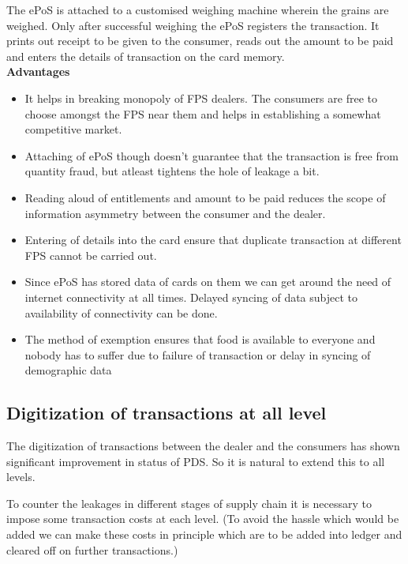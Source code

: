 \documentclass[a4paper,12pt,openany]{book}
\begin{document}
The ePoS is attached to a customised weighing machine wherein the grains are weighed. Only after successful weighing the ePoS registers the transaction. It prints out receipt to be given to the consumer, reads out the amount to be paid and enters the details of transaction on the card memory. \\

\textbf{Advantages}
\begin{itemize}
\item It helps in breaking monopoly of FPS dealers. The consumers are free to choose amongst the FPS near them and helps in establishing a somewhat competitive market.

\item Attaching of ePoS though doesn't guarantee that the transaction is free from quantity fraud, but atleast tightens the hole of leakage a bit.

\item Reading aloud of entitlements and amount to be paid reduces the scope of information asymmetry between the consumer and the dealer.

\item Entering of details into the card ensure that duplicate transaction at different FPS cannot be carried out.

\item Since ePoS has stored data of cards on them we can get around the need of internet connectivity at all times. Delayed syncing of data subject to availability of connectivity can be done.

\item The method of exemption ensures that food is available to everyone and nobody has to suffer due to failure of transaction or delay in syncing of demographic data\\

\end{itemize}


\subsection{Digitization of transactions at all level}
The digitization of transactions between the dealer and the consumers has shown significant improvement in status of PDS. So it is natural to extend this to all levels.

To counter the leakages in different stages of supply chain it is necessary to impose some transaction costs at each level. \cite{Transport} (To avoid the hassle which would be added we can make these costs in principle which are to be added into ledger and cleared off on further transactions.)
\end{document}
